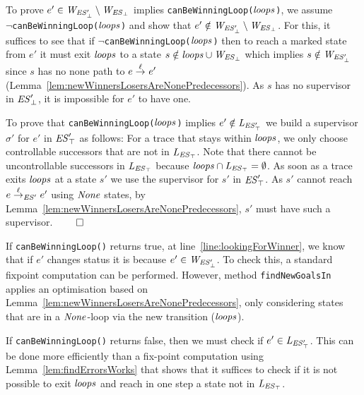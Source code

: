 \begin{Proof Sketch}
To prove $e' \in \mathit{W_{\mathit{\mathit{ES}'_{\bot}}}} \setminus \mathit{W_{\mathit{\mathit{ES}_{\bot}}}}$ implies  \texttt{canBeWinningLoop($\mathit{loops}$)}, we  
assume \\ $\neg$\texttt{canBeWinningLoop($\mathit{loops}$)} and show that $e' \notin \mathit{W_{\mathit{\mathit{ES}'_{\bot}}}} 
\setminus \mathit{W_{\mathit{\mathit{ES}_{\bot}}}}$. For this, it suffices to see that if 
$\neg$\texttt{canBeWinningLoop($\mathit{loops}$)} then to reach a marked state from $e'$ it must 
exit $\mathit{loops}$ to a state $s \notin \mathit{loops} \cup \mathit{W_{\mathit{\mathit{ES}_{\bot}}}}$ which implies  $s \notin \mathit{W_{\mathit{\mathit{ES}'_{\bot}}}}$ 
since $s$ has no none path to $e 
\overset{\ell}{\rightarrow}_{} e'$  (Lemma~\ref{lem:newWinnersLosersAreNonePredecessors}).
As $s$ has no supervisor in $\mathit{\mathit{ES}'_{\bot}}$, it is impossible 
for 
$e'$ to have one. 


To prove that \texttt{canBeWinningLoop($\mathit{loops}$)} implies $e' \notin \mathit{L_{\mathit{\mathit{ES}'_{\top}}}}$ we build a supervisor $\sigma'$ for $e'$ in $\mathit{\mathit{ES}'_{\top}}$ as 
follows: 
For a trace that stays within $\mathit{loops}$, we only choose controllable successors 
that are not 
in $\mathit{L_{\mathit{\mathit{ES}_{\top}}}}$. Note that there cannot be uncontrollable successors in $\mathit{L_{\mathit{\mathit{ES}_{\top}}}}$ because 
$\mathit{loops} \cap \mathit{L_{\mathit{\mathit{ES}_{\top}}}}= \emptyset$.   As soon as a trace exits $\mathit{loops}$ at a state $s'$ we 
use the supervisor for $s'$ in $\mathit{\mathit{ES}'_{\top}}$. 
As $s'$ cannot reach $e \overset{\ell}{\rightarrow}_{\mathit{ES}'} 
e'$ using $\mathit{None}$ states, by 
Lemma~\ref{lem:newWinnersLosersAreNonePredecessors}, $s'$ must have such a 
supervisor. \hfill$\qed$

\end{Proof Sketch}

If \texttt{canBeWinningLoop()} returns true, at line~\ref{line:lookingForWinner}, 
we know that if $e'$ changes status it is because $e' \in \mathit{W_{\mathit{\mathit{ES}'_{\bot}}}}$.  To check this, a standard 
fixpoint computation can be 
performed. 
However, method 
\texttt{findNewGoalsIn} applies an optimisation based on  
Lemma~\ref{lem:newWinnersLosersAreNonePredecessors}, only 
considering states that are in a $\mathit{None}$-loop via the new 
transition ($\mathit{loops}$).


If \texttt{canBeWinningLoop()} returns false, then we must check if  $e' \in \mathit{L_{\mathit{\mathit{ES}'_{\top}}}}$.
This can be done more efficiently than a fix-point 
computation using 
Lemma~\ref{lem:findErrorsWorks} that shows that it suffices 
to check if 
it is not possible to exit $\mathit{loops}$ and reach in one step a state not in 
$\mathit{L_{\mathit{\mathit{ES}_{\top}}}}$. 



